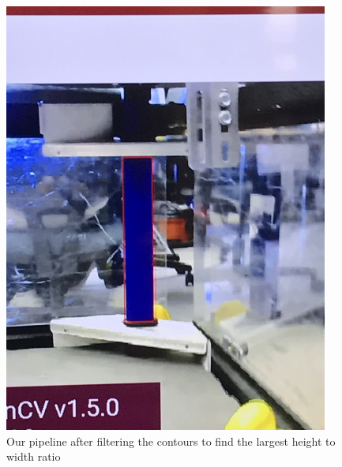\begin{figure}[ht]
\begin{minipage}[b]{.48\textwidth}
  \includegraphics[width=0.95\textwidth]{Meetings/January/01-24-22/IMG_5648 - James Hu.JPG}
  \caption{Our pipeline after filtering the contours to find the largest height to width ratio}
  \label{fig:pic2}
\end{minipage}
\end{figure}




